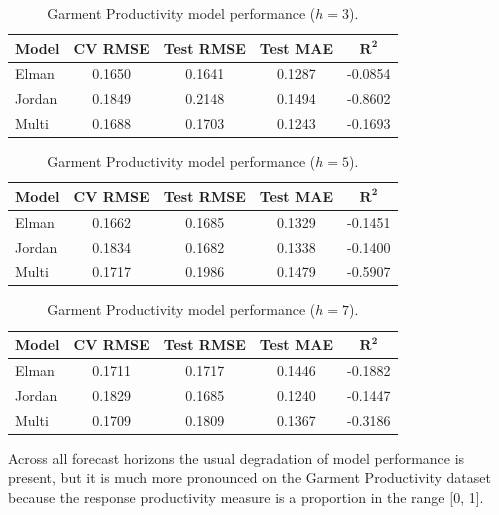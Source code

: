\documentclass[conference]{IEEEtran}
\begin{document}
\begin{table}[H]
\centering
\caption{Garment Productivity model performance ($h=3$).}
\label{tab:gp_h3}
\begin{tabular}{lcccc}
\toprule
\textbf{Model} & \textbf{CV RMSE} & \textbf{Test RMSE} & \textbf{Test MAE} & $\mathbf{R^2}$ \\
\midrule
Elman  & 0.1650 & 0.1641 & 0.1287 & -0.0854 \\
Jordan & 0.1849 & 0.2148 & 0.1494 & -0.8602 \\
Multi  & 0.1688 & 0.1703 & 0.1243 & -0.1693 \\
\bottomrule
\end{tabular}
\end{table}

\begin{table}[H]
\centering
\caption{Garment Productivity model performance ($h=5$).}
\label{tab:gp_h5}
\begin{tabular}{lcccc}
\toprule
\textbf{Model} & \textbf{CV RMSE} & \textbf{Test RMSE} & \textbf{Test MAE} & $\mathbf{R^2}$ \\
\midrule
Elman  & 0.1662 & 0.1685 & 0.1329 & -0.1451 \\
Jordan & 0.1834 & 0.1682 & 0.1338 & -0.1400 \\
Multi  & 0.1717 & 0.1986 & 0.1479 & -0.5907 \\
\bottomrule
\end{tabular}
\end{table}

\begin{table}[H]
\centering
\caption{Garment Productivity model performance ($h=7$).}
\label{tab:gp_h7}
\begin{tabular}{lcccc}
\toprule
\textbf{Model} & \textbf{CV RMSE} & \textbf{Test RMSE} & \textbf{Test MAE} & $\mathbf{R^2}$ \\
\midrule
Elman  & 0.1711 & 0.1717 & 0.1446 & -0.1882 \\
Jordan & 0.1829 & 0.1685 & 0.1240 & -0.1447 \\
Multi  & 0.1709 & 0.1809 & 0.1367 & -0.3186 \\
\bottomrule
\end{tabular}
\end{table}

Across all forecast horizons the usual degradation of model performance is present, but it is much more pronounced on the Garment Productivity dataset because the response productivity measure is a proportion in the range [0, 1].
\end{document}
